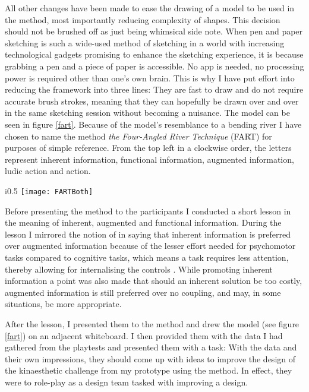 All other changes have been made to ease the drawing of a model to be used in the method, most importantly reducing complexity of shapes. This decision should not be brushed off as just being whimsical side note. When pen and paper sketching is such a wide-used method of sketching in a world with increasing technological gadgets promising to enhance the sketching experience, it is because grabbing a pen and a piece of paper is accessible. No app is needed, no processing power is required other than one's own brain. This is why I have put effort into reducing the framework into three lines: They are fast to draw and do not require accurate brush strokes, meaning that they can hopefully be drawn over and over in the same sketching session without becoming a nuisance. The model can be seen in figure \ref{fart}. Because of the model's resemblance to a bending river I have chosen to name the method \textit{the Four-Angled River Technique} (FART) for purposes of simple reference. From the top left in a clockwise order, the letters represent inherent information, functional information, augmented information, ludic action and action.

\begin{wrapfigure}{i}{0.5\textwidth}
  \texttt{[image: FARTBoth]}
  \caption{The Four-Angled River Technique. Above is the formal form and below is how it could look in practice}
  \label{fart}
\end{wrapfigure}

Before presenting the method to the participants I conducted a short lesson in the meaning of inherent, augmented and functional information. During the lesson I mirrored the notion of  in saying that inherent information is preferred over augmented information because of the lesser effort needed for psychomotor tasks compared to cognitive tasks, which means a task requires less attention, thereby allowing for internalising the controls \cite{calleja}. While promoting inherent information a point was also made that should an inherent solution be too costly, augmented information is still preferred over no coupling, and may, in some situations, be more appropriate.

After the lesson, I presented them to the method and drew the model (see figure \ref{fart}) on an adjacent whiteboard. I then provided them with the data I had gathered from the playtests and presented them with a task: With the data and their own impressions, they should come up with ideas to improve the design of the kinaesthetic challenge from my prototype using the method. In effect, they were to role-play as a design team tasked with improving a design.

